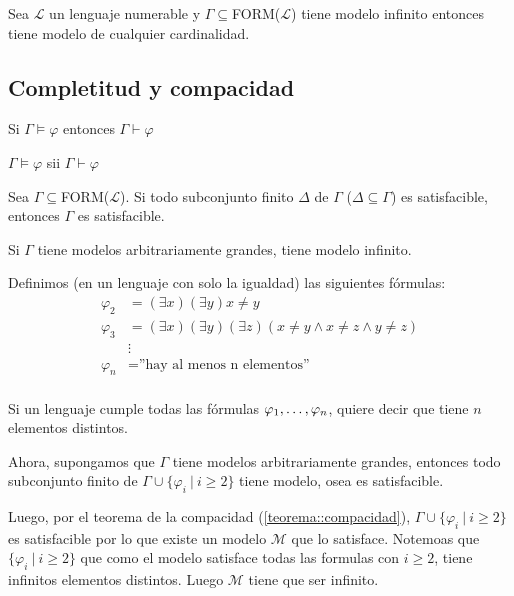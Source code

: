 \begin{teorema}
	Sea $\mathcal{L}$ un lenguaje numerable y $\Gamma\subseteq$FORM($\mathcal{L}$) tiene modelo infinito entonces tiene modelo de cualquier cardinalidad.	
\end{teorema}

\subsection{Completitud y compacidad}

\begin{teorema}
	Si $\Gamma\vDash\varphi$ entonces $\Gamma\vdash\varphi$
\end{teorema}

\begin{corolario}
	$\Gamma\vDash\varphi$ sii $\Gamma\vdash\varphi$
\end{corolario}

\begin{teorema}\label{teorema::compacidad}
	Sea $\Gamma\subseteq$FORM($\mathcal{L}$). Si todo subconjunto finito $\Delta$ de $\Gamma$ ($\Delta\subseteq\Gamma$) es satisfacible, entonces $\Gamma$ es satisfacible.
\end{teorema}

\begin{teorema}
	Si $\Gamma$ tiene modelos arbitrariamente grandes, tiene modelo infinito.
\end{teorema}

\begin{demo}
	Definimos (en un lenguaje con solo la igualdad) las siguientes fórmulas:
	\begin{align*}
		\varphi_2 &= (\exists x)(\exists y) x\neq y \\
		\varphi_3 &= (\exists x)(\exists y)(\exists z) (x\neq y \land x \neq z \land y\neq z)\\
		&\vdots \\
	\varphi_n &= \text{''hay al menos n elementos''} \\
	\end{align*}
	\end{demo}
\begin{demoPart}
	Si un lenguaje cumple todas las fórmulas $\varphi_1,\dots, \varphi_{n}$, quiere decir que tiene $n$ elementos distintos.

	Ahora, supongamos que $\Gamma$ tiene modelos arbitrariamente grandes, entonces todo subconjunto finito de $\Gamma\cup\{\varphi_i~|~i\geq 2\}$ tiene modelo, osea es satisfacible.
	
	Luego, por el teorema de la compacidad (\ref{teorema::compacidad}),  $\Gamma\cup\{\varphi_i~|~i\geq 2\}$ es satisfacible por lo que existe un modelo $\mathcal{M}$ que lo satisface. Notemoas que $\{\varphi_i~|~i\geq 2\}$ que como el modelo satisface todas las formulas con $i\geq 2$, tiene infinitos elementos distintos. Luego $\mathcal{M}$	 tiene que ser infinito.
\end{demoPart}

